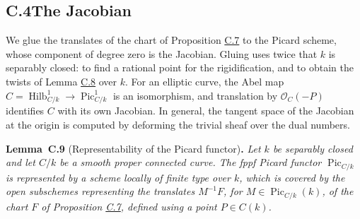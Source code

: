 \documentclass[11pt]{article}
\newenvironment{bpstatement}[2]{\par\addvspace{0.6\baselineskip}\noindent\textbf{#1}#2\textbf{.}\enspace\ignorespaces}
  {\par\addvspace{0.4\baselineskip}}
\newenvironment{bpstatementit}[2]{\begin{bpstatement}{#1}{#2}\itshape\ignorespaces}{\end{bpstatement}}
\begin{document}
\subsection*{\texorpdfstring{C.4\quad The Jacobian}{C.4 The Jacobian}}
\label{bp147}%
\label{bp148}%
We glue the translates of the chart of Proposition \hyperref[bp142]{C.7} to the Picard scheme, whose component of degree zero is the Jacobian. Gluing uses twice that \(k\) is separably closed: to find a rational point for the rigidification, and to obtain the twists of Lemma \hyperref[bp145]{C.8} over \(k\). For an elliptic curve, the Abel map \(C=\operatorname{Hilb}^{1}_{C/k}\to\operatorname{Pic}^1_{C/k}\) is an isomorphism, and translation by \(\mathcal O_C(-P)\) identifies \(C\) with its own Jacobian. In general, the tangent space of the Jacobian at the origin is computed by deforming the trivial sheaf over the dual numbers.

\label{bp149}%
\begin{bpstatementit}{Lemma~C.9}{ (Representability of the Picard functor)}
Let \(k\) be separably closed and let \(C/k\) be a smooth proper connected curve. The fppf Picard functor \(\operatorname{Pic}_{C/k}\) is represented by a scheme locally of finite type over \(k\), which is covered by the open subschemes representing the translates \(M^{-1}F\), for \(M\in\operatorname{Pic}_{C/k}(k)\), of the chart \(F\) of Proposition \hyperref[bp142]{C.7}, defined using a point \(P\in C(k)\).
\end{bpstatementit}
\end{document}
